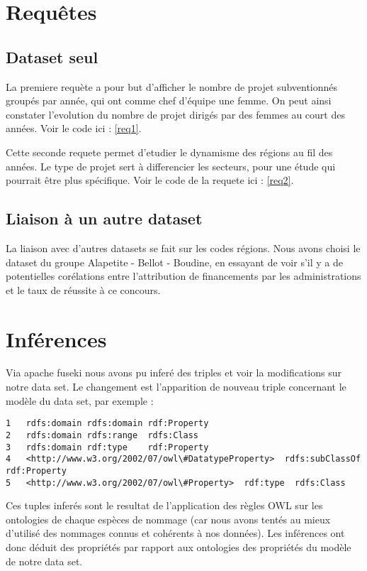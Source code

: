 \chapter{Requêtes}
\section{Dataset seul}

La premiere requète a pour but d'afficher le nombre de projet subventionnés groupés par année, qui ont comme chef d'équipe une femme. On peut ainsi constater l'evolution du nombre de projet dirigés par des femmes au court des années. Voir le code ici : \autoref{req1}.


Cette seconde requete permet d'etudier le dynamisme des régions au fil des années. Le type de projet sert à differencier les secteurs, pour une étude qui pourrait être plus spécifique. Voir le code de la requete ici : \autoref{req2}.

\section{Liaison à un autre dataset}

La liaison avec d'autres datasets se fait sur les codes régions. Nous avons choisi le dataset du groupe Alapetite - Bellot - Boudine, en essayant de voir s'il y a de potentielles corélations entre l'attribution de financements par les administrations et le taux de réussite à ce concours.


\chapter{Inférences}

Via apache fuseki nous avons pu inferé des triples et voir la modifications sur notre data set. Le changement est l'apparition de nouveau triple concernant le modèle du data set, par exemple :

\begin{lstlisting}
1	rdfs:domain rdfs:domain rdf:Property
2	rdfs:domain rdfs:range  rdfs:Class
3	rdfs:domain rdf:type    rdf:Property
4	<http://www.w3.org/2002/07/owl\#DatatypeProperty>  rdfs:subClassOf rdf:Property
5	<http://www.w3.org/2002/07/owl\#Property>  rdf:type  rdfs:Class
\end{lstlisting}

Ces tuples inferés sont le resultat de l'application des règles OWL sur les ontologies de chaque espèces de nommage (car nous avons tentés au mieux d'utilisé des nommages connus et cohérents à nos données).
Les inférences ont donc déduit des propriétés par rapport aux ontologies des propriétés du modèle de notre data set.

